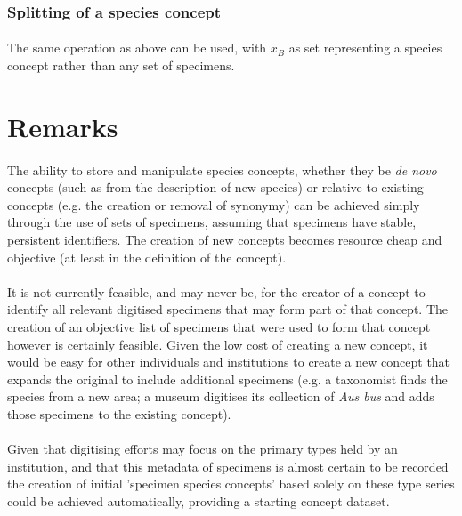 \documentclass{article}
\begin{document}
   \subsubsection{Splitting of a species concept}
   \paragraph{}
   The same operation as above can be used, with $x_B$ as set representing a species concept rather than any set of specimens.
   
   \section{Remarks}
   \paragraph{}
   The ability to store and manipulate species concepts, whether they be \textit{de novo} concepts (such as from the description of new species) or relative to existing concepts (e.g. the creation or removal of synonymy) can be achieved simply through the use of sets of specimens, assuming that specimens have stable, persistent identifiers. The creation of new concepts becomes resource cheap and objective (at least in the definition of the concept).
   
   \paragraph{}
   It is not currently feasible, and may never be, for the creator of a concept to identify all relevant digitised specimens that may form part of that concept. The creation of an objective list of specimens that were used to form that concept however is certainly feasible. Given the low cost of creating a new concept, it would be easy for other individuals and institutions to create a new concept that expands the original to include additional specimens (e.g. a taxonomist finds the species from a new area; a museum digitises its collection of \textit{Aus bus} and adds those specimens to the existing concept).
   
   \paragraph{}
   Given that digitising efforts may focus on the primary types held by an institution, and that this metadata of specimens is almost certain to be recorded the creation of initial 'specimen species concepts' based solely on these type series could be achieved automatically, providing a starting concept dataset.
   
\end{document}
